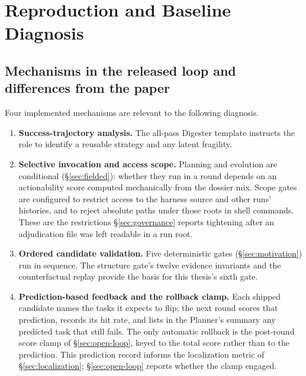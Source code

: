 \chapter{Reproduction and Baseline Diagnosis}
\label{ch:baseline}



\section{Mechanisms in the released loop and differences from the paper}
\label{sec:official-strengths}

Four implemented mechanisms are relevant to the following diagnosis.

\begin{enumerate}
  \item \textbf{Success-trajectory analysis.} The all-pass Digester
        template instructs the role to identify a reusable strategy and any
        latent fragility.
  \item \textbf{Selective invocation and access scope.} Planning and
        evolution are conditional (\S\ref{sec:fielded}): whether they run
        in a round depends on an actionability score computed mechanically
        from the dossier mix. Scope gates are configured to restrict access to the harness
        source and other runs' histories, and to reject absolute paths under
        those roots in shell commands. These are the restrictions
        \S\ref{sec:governance} reports tightening after an adjudication
        file was left readable in a run root.
  \item \textbf{Ordered candidate validation.} Five deterministic gates
        (\S\ref{sec:motivation}) run in sequence. The structure gate's
        twelve evidence invariants and the counterfactual replay provide the
        basis for this thesis's sixth gate.
  \item \textbf{Prediction-based feedback and the rollback clamp.} Each
        shipped candidate names the tasks it expects to flip; the next round
        scores that prediction, records its hit rate, and lists in the
        Planner's summary any predicted task that still fails. The only
        automatic rollback is the post-round score clamp of
        \S\ref{sec:open-loop}, keyed to the total score rather than to the
        prediction. This prediction record informs the localization metric
        of \S\ref{sec:localization}; \S\ref{sec:open-loop} reports whether
        the clamp engaged.
\end{enumerate}

